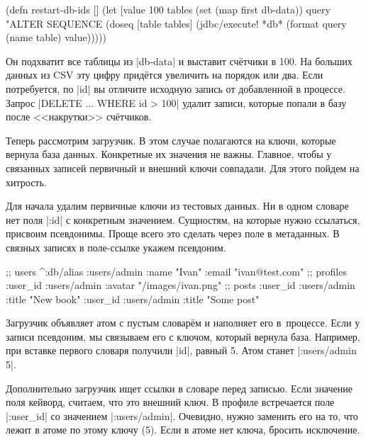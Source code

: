 \begin{english}
  \begin{clojure}
(defn restart-db-ids []
  (let [value 100
        tables (set (map first db-data))
        query "ALTER SEQUENCE %
    (doseq [table tables]
      (jdbc/execute! *db* (format query (name table) value)))))
  \end{clojure}
\end{english}

Он подхватит все таблицы из \spverb|db-data| и выставит счётчики в 100. На
больших данных из CSV эту цифру придётся увеличить на порядок или два. Если
потребуется, по \spverb|id| вы отличите исходную запись от добавленной в
процессе. Запрос \spverb|DELETE ... WHERE id > 100| удалит записи, которые
попали в базу после <<накрутки>> счётчиков.

Теперь рассмотрим загрузчик. В этом случае полагаются на ключи, которые вернула
база данных. Конкретные их значения не важны. Главное, чтобы у связанных записей
первичный и внешний ключи совпадали. Для этого пойдем на хитрость.

Для начала удалим первичные ключи из тестовых данных. Ни в одном словаре нет
поля \spverb|:id| с конкретным значением. Сущностям, на которые нужно ссылаться,
присвоим псевдонимы. Проще всего это сделать через поле в метаданных. В связных
записях в поле-ссылке укажем псевдоним.


\begin{english}
  \begin{clojure}
;; users
^{:db/alias :users/admin}
 {:name "Ivan" :email "ivan@test.com"}
;; profiles
{:user_id :users/admin :avatar "/images/ivan.png"}
;; posts
{:user_id :users/admin :title "New book"}
{:user_id :users/admin :title "Some post"}
  \end{clojure}
\end{english}

Загрузчик объявляет атом с пустым словарём и наполняет его в~процессе. Если у
записи псевдоним, мы связываем его с ключом, который вернула база. Например, при
вставке первого словаря получили \spverb|id|, равный 5. Атом станет
\spverb|{:users/admin 5}|.

Дополнительно загрузчик ищет ссылки в словаре перед записью. Если значение
поля кейворд, считаем, что это внешний ключ. В профиле встречается поле
\spverb|:user_id| со значением \spverb|:users/admin|. Очевидно, нужно заменить
его на то, что лежит в атоме по этому ключу (5). Если в атоме нет ключа,
бросить исключение.

